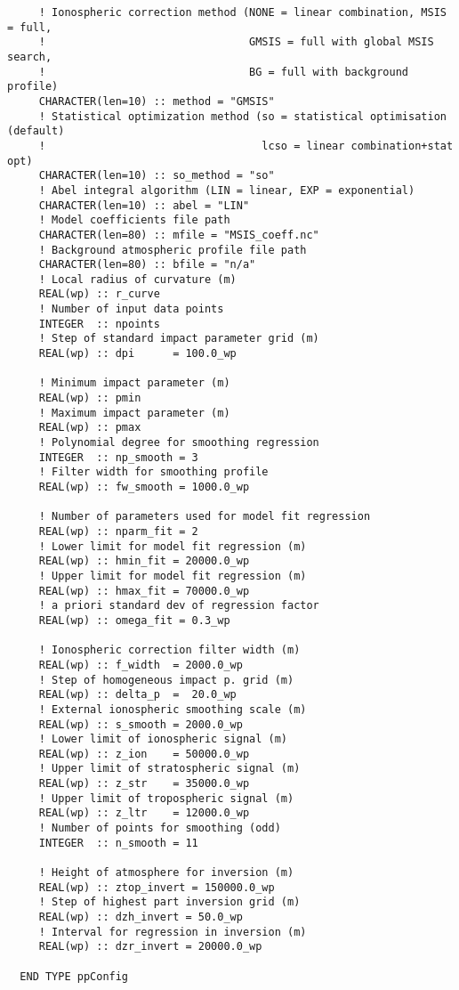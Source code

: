 \begin{Verbatim}
     ! Ionospheric correction method (NONE = linear combination, MSIS = full,
     !                                GMSIS = full with global MSIS search,
     !                                BG = full with background profile)
     CHARACTER(len=10) :: method = "GMSIS"
     ! Statistical optimization method (so = statistical optimisation (default)
     !                                  lcso = linear combination+stat opt)
     CHARACTER(len=10) :: so_method = "so"
     ! Abel integral algorithm (LIN = linear, EXP = exponential)
     CHARACTER(len=10) :: abel = "LIN" 
     ! Model coefficients file path
     CHARACTER(len=80) :: mfile = "MSIS_coeff.nc"      
     ! Background atmospheric profile file path
     CHARACTER(len=80) :: bfile = "n/a"  
     ! Local radius of curvature (m)
     REAL(wp) :: r_curve               
     ! Number of input data points
     INTEGER  :: npoints               
     ! Step of standard impact parameter grid (m)
     REAL(wp) :: dpi      = 100.0_wp    

     ! Minimum impact parameter (m)
     REAL(wp) :: pmin                  
     ! Maximum impact parameter (m)
     REAL(wp) :: pmax                  
     ! Polynomial degree for smoothing regression
     INTEGER  :: np_smooth = 3         
     ! Filter width for smoothing profile
     REAL(wp) :: fw_smooth = 1000.0_wp 

     ! Number of parameters used for model fit regression
     REAL(wp) :: nparm_fit = 2
     ! Lower limit for model fit regression (m)
     REAL(wp) :: hmin_fit = 20000.0_wp 
     ! Upper limit for model fit regression (m)
     REAL(wp) :: hmax_fit = 70000.0_wp 
     ! a priori standard dev of regression factor
     REAL(wp) :: omega_fit = 0.3_wp    

     ! Ionospheric correction filter width (m)
     REAL(wp) :: f_width  = 2000.0_wp   
     ! Step of homogeneous impact p. grid (m)
     REAL(wp) :: delta_p  =  20.0_wp   
     ! External ionospheric smoothing scale (m)  
     REAL(wp) :: s_smooth = 2000.0_wp  
     ! Lower limit of ionospheric signal (m)
     REAL(wp) :: z_ion    = 50000.0_wp 
     ! Upper limit of stratospheric signal (m)
     REAL(wp) :: z_str    = 35000.0_wp 
     ! Upper limit of tropospheric signal (m)
     REAL(wp) :: z_ltr    = 12000.0_wp 
     ! Number of points for smoothing (odd)
     INTEGER  :: n_smooth = 11         

     ! Height of atmosphere for inversion (m)
     REAL(wp) :: ztop_invert = 150000.0_wp 
     ! Step of highest part inversion grid (m)
     REAL(wp) :: dzh_invert = 50.0_wp      
     ! Interval for regression in inversion (m)
     REAL(wp) :: dzr_invert = 20000.0_wp   

  END TYPE ppConfig
\end{Verbatim}
